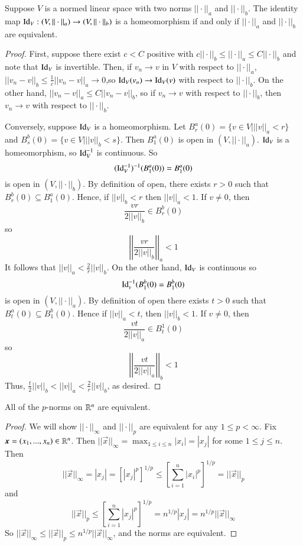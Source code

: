 \begin{proposition}
    Suppose $V$ is a normed linear space with two norms $||\cdot||_a$ and $||\cdot||_b$. The identity map $\operatorname{Id}_V:(V,||\cdot||_a)\rightarrow (V,||\cdot||_b)$ is a homeomorphism if and only if $||\cdot||_a$ and $||\cdot||_b$ are equivalent.
\end{proposition}
\begin{proof}
    First, suppose there exist $c < C$ positive with $c||\cdot||_b\leq ||\cdot||_a\leq C||\cdot||_b$ and note that $\operatorname{Id}_V$ is invertible. Then, if $v_n\rightarrow v$ in $V$ with respect to $||\cdot||_a$, $||v_n-v||_b\leq \frac{1}{c}||v_n-v||_a\rightarrow 0$,so $\operatorname{Id}_V(v_n)\rightarrow \operatorname{Id}_V(v)$ with respect to $||\cdot||_b$. On the other hand, $||v_n-v||_a\leq C||v_n-v||_b$, so if $v_n\rightarrow v$ with respect to $||\cdot||_b$, then $v_n\rightarrow v$ with respect to $||\cdot||_b$.

    Conversely, suppose $\operatorname{Id}_V$ is a homeomorphism. Let $B_r^a(0) = \{v \in V\vert||v||_a < r\}$ and $B_s^b(0) = \{v \in V\vert||v||_b < s\}$. Then $B_1^a(0)$ is open in $(V,||\cdot||_a)$. $\operatorname{Id}_V$ is a homeomorphism, so $\operatorname{Id}_V^{-1}$ is continuous. So $$(\operatorname{Id}_V^{-1})^{-1}(B_1^a(0)) = B_1^a(0)$$ is open in $(V,||\cdot||_b)$. By definition of open, there exists $r > 0$ such that $B_r^b(0) \subseteq B_1^a(0)$. Hence, if $||v||_b < r$ then $||v||_a < 1$. If $v\neq 0$, then $$\frac{vr}{2||v||_b} \in B_r^b(0)$$ so $$\left|\left|\frac{vr}{2||v||_b}\right|\right|_a < 1$$ It follows that $||v||_a < \frac{2}{r}||v||_b$. On the other hand, $\operatorname{Id}_V$ is continuous so $$\operatorname{Id}_v^{-1}(B_1^b(0) = B_1^b(0)$$ is open in $(V,||\cdot||_a)$. By definition of open there exists $t > 0$ such that $B_t^a(0) \subseteq B_1^b(0)$. Hence if $||v||_a < t$, then $||v||_b < 1$. If $v \neq 0$, then $$\frac{vt}{2||v||_a} \in B_t^1(0)$$ so $$\left|\left|\frac{vt}{2||v||_a}\right|\right|_b < 1$$ Thus, $\frac{t}{2}||v||_b < ||v||_a < \frac{2}{r}||v||_b$, as desired.
\end{proof}

\begin{proposition}
    All of the $p$-norms on $\mathbb R^n$ are equivalent.
\end{proposition}
\begin{proof}
    We will show $||\cdot||_{\infty}$ and $||\cdot||_p$ are equivalent for any $1 \leq p < \infty$. Fix $\vec{x} = (x_1,...,x_n) \in \R^n$. Then $||\vec{x}||_{\infty} = \max_{1\leq i\leq n}|x_i| = |x_j|$ for some $1 \leq j \leq n$. Then $$||\vec{x}||_{\infty} = |x_j| = [|x_j|^p]^{1/p} \leq \left[\sum_{i=1}^n|x_i|^p\right]^{1/p} = ||\vec{x}||_p$$ and $$||\vec{x}||_p \leq \left[\sum_{i=1}^n|x_j|^p\right]^{1/p} = n^{1/p}|x_j| = n^{1/p}||\vec{x}||_{\infty}$$ So $||\vec{x}||_{\infty} \leq ||\vec{x}||_p\leq n^{1/p}||\vec{x}||_{\infty}$, and the norms are equivalent.
\end{proof}

